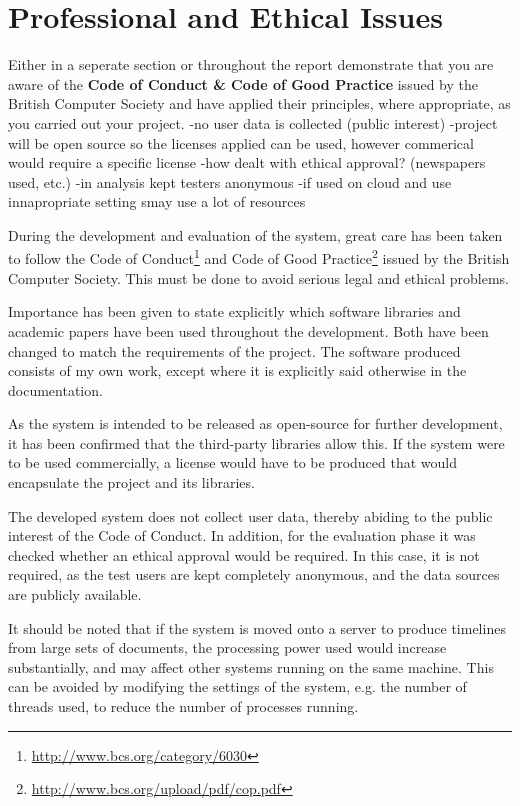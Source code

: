 \chapter{Professional and Ethical Issues}
Either in a seperate section or throughout the report demonstrate that you are aware of the \textbf{Code of Conduct \& Code of Good Practice} issued by the British Computer Society and have applied their principles, where appropriate, as you carried out your project.
-no user data is collected (public interest)
-project will be open source so the licenses applied can be used, however commerical would require a specific license
-how dealt with ethical approval? (newspapers used, etc.)
-in analysis kept testers anonymous
-if used on cloud and use innapropriate setting smay use a lot of resources
\par During the development and evaluation of the system, great care has been taken to follow the Code of Conduct\footnote{\url{http://www.bcs.org/category/6030}} and Code of Good Practice\footnote{\url{http://www.bcs.org/upload/pdf/cop.pdf}} issued by the British Computer Society. This must be done to avoid serious legal and ethical problems.
\par Importance has been given to state explicitly which software libraries and academic papers have been used throughout the development. Both have been changed to match the requirements of the project. The software produced consists of my own work, except where it is explicitly said otherwise in the documentation. 
\par As the system is intended to be released as open-source for further development, it has been confirmed that the third-party libraries allow this. If the system were to be used commercially, a license would have to be produced that would encapsulate the project and its libraries.
\par The developed system does not collect user data, thereby abiding to the public interest of the Code of Conduct. In addition, for the evaluation phase it was checked whether an ethical approval would be required. In this case, it is not required, as the test users are kept completely anonymous, and the data sources are publicly available.
\par It should be noted that if the system is moved onto a server to produce timelines from large sets of documents, the processing power used would increase substantially, and may affect other systems running on the same machine. This can be avoided by modifying the settings of the system, e.g. the number of threads used, to reduce the number of processes running.

